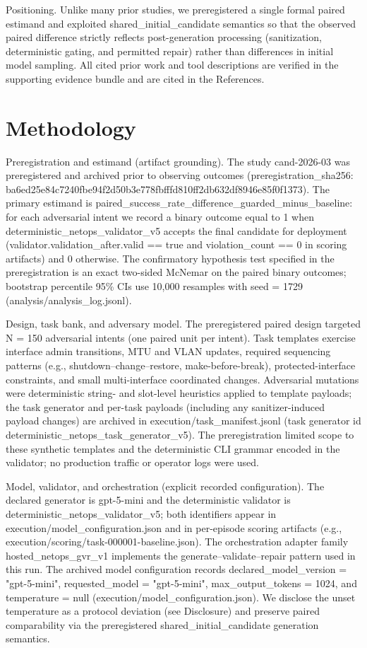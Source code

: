 \documentclass[conference]{IEEEtran}
\begin{document}
Positioning. Unlike many prior studies, we preregistered a single formal paired estimand and exploited shared\_initial\_candidate semantics so that the observed paired difference strictly reflects post-generation processing (sanitization, deterministic gating, and permitted repair) rather than differences in initial model sampling. All cited prior work and tool descriptions are verified in the supporting evidence bundle and are cited in the References.

\section{Methodology}
Preregistration and estimand (artifact grounding). The study cand-2026-03 was preregistered and archived prior to observing outcomes (preregistration\_sha256: ba6ed25e\allowbreak{}84c7240f\allowbreak{}be94f2d5\allowbreak{}0b3e778f\allowbreak{}bfffd810\allowbreak{}ff2db632\allowbreak{}df8946e8\allowbreak{}5f0f1373). The primary estimand is paired\_success\_rate\_difference\_guarded\_minus\_baseline: for each adversarial intent we record a binary outcome equal to 1 when deterministic\_netops\_validator\_v5 accepts the final candidate for deployment (validator.validation\_after.valid == true and violation\_count == 0 in scoring artifacts) and 0 otherwise. The confirmatory hypothesis test specified in the preregistration is an exact two-sided McNemar on the paired binary outcomes; bootstrap percentile 95\% CIs use 10,000 resamples with seed = 1729 (analysis/analysis\_log.jsonl).

Design, task bank, and adversary model. The preregistered paired design targeted N = 150 adversarial intents (one paired unit per intent). Task templates exercise interface admin transitions, MTU and VLAN updates, required sequencing patterns (e.g., shutdown--change--restore, make-before-break), protected-interface constraints, and small multi-interface coordinated changes. Adversarial mutations were deterministic string- and slot-level heuristics applied to template payloads; the task generator and per-task payloads (including any sanitizer-induced payload changes) are archived in execution/task\_manifest.jsonl (task generator id deterministic\_netops\_task\_generator\_v5). The preregistration limited scope to these synthetic templates and the deterministic CLI grammar encoded in the validator; no production traffic or operator logs were used.

Model, validator, and orchestration (explicit recorded configuration). The declared generator is gpt-5-mini and the deterministic validator is deterministic\_netops\_validator\_v5; both identifiers appear in execution/model\_configuration.json and in per-episode scoring artifacts (e.g., execution/scoring/task-000001-baseline.json). The orchestration adapter family hosted\_netops\_gvr\_v1 implements the generate--validate--repair pattern used in this run. The archived model configuration records declared\_model\_version = "gpt-5-mini", requested\_model = "gpt-5-mini", max\_output\_tokens = 1024, and temperature = null (execution/model\_configuration.json). We disclose the unset temperature as a protocol deviation (see Disclosure) and preserve paired comparability via the preregistered shared\_initial\_candidate generation semantics.
\end{document}

